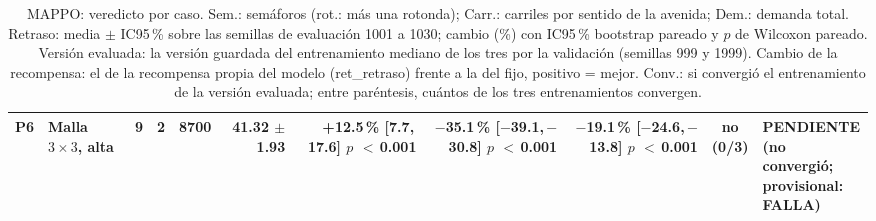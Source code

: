 \begin{table}[H]
\begin{tabular}{llcrrrrrrcl}
P6 & \makecell[l]{Malla $3 \times 3$,\\{}alta} & 9 & 2 & 8700 & \makecell[r]{41.32\\{}$\pm$ 1.93} & \makecell[r]{+12.5\,\%\\{}[7.7,\,17.6]\\$p$ $<$\,0.001} & \makecell[r]{$-$35.1\,\%\\{}[$-$39.1,\,$-$30.8]\\$p$ $<$\,0.001} & \makecell[r]{$-$19.1\,\%\\{}[$-$24.6,\,$-$13.8]\\$p$ $<$\,0.001} & \makecell[c]{no\\{}(0/3)} & \makecell[l]{PENDIENTE\\{}(no convergió;\\{}provisional:\\{}FALLA)} \\
\bottomrule
\end{tabular}
\caption[Veredicto de MAPPO]{MAPPO: veredicto por caso. Sem.: semáforos (rot.: más una rotonda); Carr.: carriles por sentido de la avenida; Dem.: demanda total. Retraso: media $\pm$ IC95\,\% sobre las semillas de evaluación 1001 a 1030; cambio (\%) con IC95\,\% bootstrap pareado y $p$ de Wilcoxon pareado. Versión evaluada: la versión guardada del entrenamiento mediano de los tres por la validación (semillas 999 y 1999). Cambio de la recompensa: el de la recompensa propia del modelo (ret\_retraso) frente a la del fijo, positivo = mejor. Conv.: si convergió el entrenamiento de la versión evaluada; entre paréntesis, cuántos de los tres entrenamientos convergen.}
\label{tab:veredicto-mappo}
\end{table}
